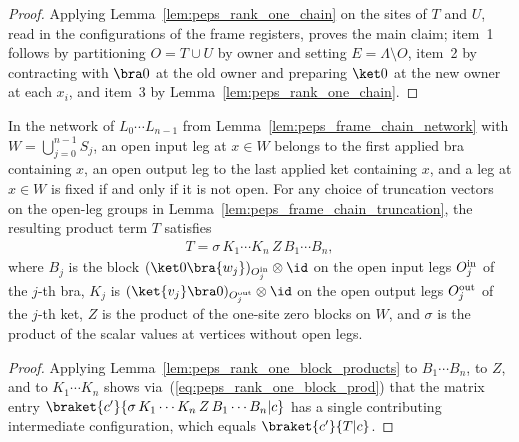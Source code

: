 \begin{proof}\leanok
    Applying Lemma~\ref{lem:peps_rank_one_chain} on the sites of $T$ and $U$, read in the
    configurations of the frame registers, proves the main claim; item~1 follows by partitioning $O=T\cup U$ by owner and setting $E=\Lambda\setminus O$, item~2 by contracting with $\bra0$ at the old owner and preparing $\ket0$ at the new owner at each $x_i$, and item~3 by Lemma~\ref{lem:peps_rank_one_chain}.
\end{proof}

\begin{lemma}
    \label{lem:peps_product_term_blocks}
    \leanok
    In the network of $L_0\cdots L_{n-1}$ from Lemma~\ref{lem:peps_frame_chain_network} with $W=\bigcup_{j=0}^{n-1}S_j$,
    an open input leg at $x\in W$ belongs to the first applied bra containing $x$, an open output
    leg to the last applied ket containing $x$, and a leg at $x\in W$ is fixed if and only if it is not open. For any choice of truncation vectors on the open-leg groups in Lemma~\ref{lem:peps_frame_chain_truncation}, the resulting product term $T$ satisfies
    \begin{align}
        T=\sigma\,K_1\cdots K_n\,Z\,B_1\cdots B_n,
        \label{eq:peps_product_term_blocks}
    \end{align}
    where $B_j$ is the block $(\ket0\bra{w_j})_{O^{\rm in}_j}\otimes\id$ on the open input legs $O^{\rm in}_j$ of the $j$-th bra, $K_j$ is $(\ket{v_j}\bra0)_{O^{\rm out}_j}\otimes\id$ on the open output legs $O^{\rm out}_j$ of the $j$-th ket, $Z$ is the product of the one-site zero
    blocks on $W$, and $\sigma$ is the product of the scalar values at vertices without open legs.
\end{lemma}

\begin{proof}\leanok
    Applying Lemma~\ref{lem:peps_rank_one_block_products} to $B_1\cdots B_n$, to $Z$, and to $K_1\cdots K_n$ shows via~(\ref{eq:peps_rank_one_block_prod}) that the matrix entry $\braket{c'}{\sigma\,K_1\cdots K_n\,Z\,B_1\cdots B_n|c}$ has a single contributing intermediate configuration, which equals $\braket{c'}{T|c}$.
\end{proof}

